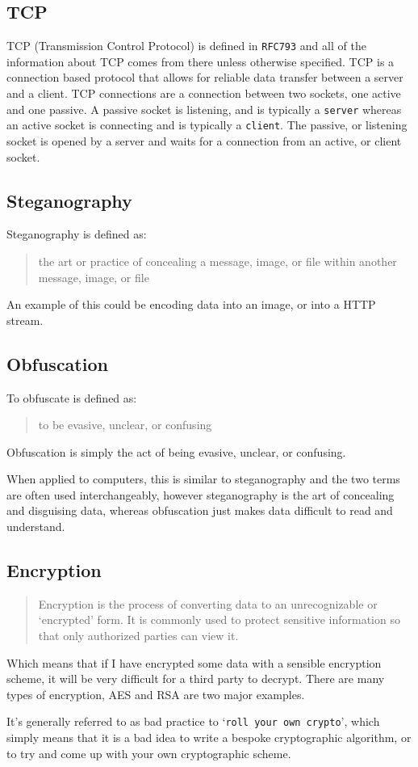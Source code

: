 \subsection{TCP}
TCP (Transmission Control Protocol) is defined in \texttt{RFC793}\cite{rfc793} and all of the information about TCP comes from there unless otherwise specified.
TCP is a connection based protocol that allows for reliable data transfer between a server and a client.
TCP connections are a connection between two sockets, one active and one passive.
A passive socket is listening, and is typically a \texttt{server} whereas an active socket is connecting and is typically a \texttt{client}.
The passive, or listening socket is opened by a server and waits for a connection from an active, or client socket.

\subsection{Steganography}
Steganography is defined as\cite{dictsteno}:
\begin{quotation}
    the art or practice of concealing a message, image, or file within
    another message, image, or file
\end{quotation}
An example of this could be encoding data into an image, or into a HTTP stream.

\subsection{Obfuscation}
To obfuscate is defined as\cite{dictobfs}:
\begin{quotation}
     to be evasive, unclear, or confusing
\end{quotation}
Obfuscation is simply the act of being evasive, unclear, or confusing.\par
When applied to computers, this is similar to steganography and the two terms are often used interchangeably, however steganography is the art of concealing and disguising data, whereas obfuscation just makes data difficult to read and understand. 

\subsection{Encryption}
\begin{quotation}
    Encryption is the process of converting data to an unrecognizable or
    `encrypted' form. It is commonly used to protect sensitive
    information so that only authorized parties can view it\cite{dictenc}.
\end{quotation}
Which means that if I have encrypted some data with a sensible encryption scheme, it will be very difficult for a third party to decrypt.
There are many types of encryption, AES and RSA are two major examples.\par
It's generally referred to as bad practice to `\texttt{roll your own crypto}'\cite{memtocrypto}, which simply means that it is a bad idea to write a bespoke cryptographic algorithm, or to try and come up with your own cryptographic scheme.

